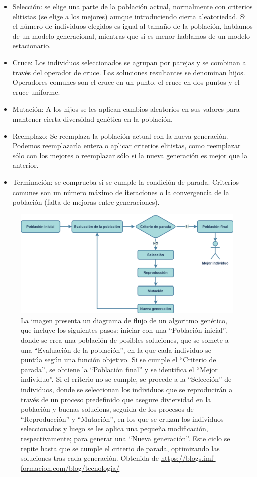 \begin{itemize}
	\item Selección: se elige una parte de la población actual, normalmente con criterios elitistas (se elige a los mejores) aunque introduciendo cierta aleatoriedad. Si el número de individuos elegidos es igual al tamaño de la población, hablamos de un modelo generacional, mientras que si es menor hablamos de un modelo estacionario. 
	\item Cruce: Los individuos seleccionados se agrupan por parejas y se combinan a través del operador de cruce. Las soluciones resultantes se denominan hijos. Operadores comunes son el cruce en un punto, el cruce en dos puntos y el cruce uniforme. 
	\item Mutación: A los hijos se les aplican cambios aleatorios en sus valores para mantener cierta diversidad genética en la población.
	\item Reemplazo: Se reemplaza la población actual con la nueva generación. Podemos reemplazarla entera o aplicar criterios elitistas, como reemplazar sólo con los mejores o reemplazar sólo si la nueva generación es mejor que la anterior.
	\item Terminación: se comprueba si se cumple la condición de parada. Criterios comunes son un número máximo de iteraciones o la convergencia de la población (falta de mejoras entre generaciones).
\end{itemize}

\begin{figure}
    \centering
    \includegraphics[width=0.75\linewidth]{Plantilla_TFG_latex//imagenes//Inf//2.Fund/alg_gen.png}
    \caption[Etapas de un algoritmo genético]{La imagen presenta un diagrama de flujo de un algoritmo genético, que incluye los siguientes pasos: iniciar con una ``Población inicial'', donde se crea una población de posibles soluciones, que se somete a una ``Evaluación de la población'', en la que cada individuo se puntúa según una función objetivo. Si se cumple el ``Criterio de parada'', se obtiene la ``Población final'' y se identifica el ``Mejor individuo''. Si el criterio no se cumple, se procede a la ``Selección'' de individuos, donde se seleccionan los individuos que se reproducirán a través de un proceso predefinido que asegure diviersidad en la población y buenas solucions, seguida de los procesos de ``Reproducción'' y ``Mutación'', en los que se cruzan los individuos seleccionados y luego se les aplica una pequeña modificación, respectivamente; para generar una ``Nueva generación''. Este ciclo se repite hasta que se cumple el criterio de parada, optimizando las soluciones tras cada generación. Obtenida de \url{https://blogs.imf-formacion.com/blog/tecnologia/}}
    \label{fig:gen_alg}
\end{figure}

